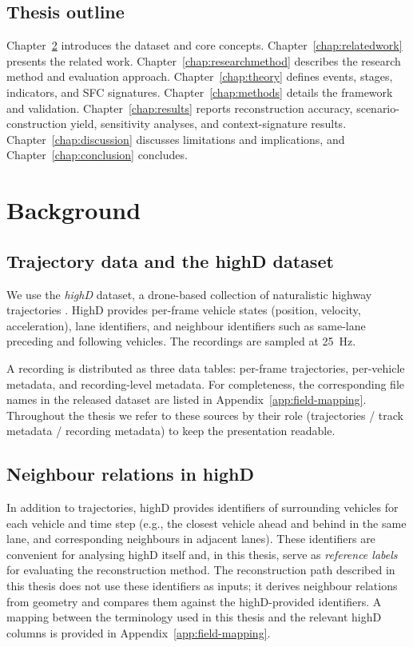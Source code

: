 \documentclass[12pt,a4paper,twoside,openright]{report}
\begin{document}
    \section{Thesis outline}
    Chapter~\ref{chap:background} introduces the dataset and core concepts. Chapter~\ref{chap:relatedwork} presents the related work. Chapter~\ref{chap:researchmethod} describes the research method and evaluation approach. Chapter~\ref{chap:theory} defines events, stages, indicators, and SFC signatures. Chapter~\ref{chap:methods} details the framework and validation. Chapter~\ref{chap:results} reports reconstruction accuracy, scenario-construction yield, sensitivity analyses, and context-signature results. Chapter~\ref{chap:discussion} discusses limitations and implications, and Chapter~\ref{chap:conclusion} concludes.

    \chapter{Background}
    \label{chap:background}

    \section{Trajectory data and the highD dataset}
    We use the \textit{highD} dataset, a drone-based collection of naturalistic highway trajectories \cite{highd_2018}. HighD provides per-frame vehicle states (position, velocity, acceleration), lane identifiers, and neighbour identifiers such as same-lane preceding and following vehicles. The recordings are sampled at \SI{25}{\hertz}.

    A recording is distributed as three data tables: per-frame trajectories, per-vehicle metadata, and recording-level metadata. For completeness, the corresponding file names in the released dataset are listed in Appendix~\ref{app:field-mapping}. Throughout the thesis we refer to these sources by their role (trajectories / track metadata / recording metadata) to keep the presentation readable.



    \section{Neighbour relations in highD}
    In addition to trajectories, highD provides identifiers of surrounding vehicles for each vehicle and time step (e.g., the closest vehicle ahead and behind in the same lane, and corresponding neighbours in adjacent lanes). These identifiers are convenient for analysing highD itself and, in this thesis, serve as \emph{reference labels} for evaluating the reconstruction method. The reconstruction path described in this thesis does not use these identifiers as inputs; it derives neighbour relations from geometry and compares them against the highD-provided identifiers. A mapping between the terminology used in this thesis and the relevant highD columns is provided in Appendix~\ref{app:field-mapping}.
\end{document}
